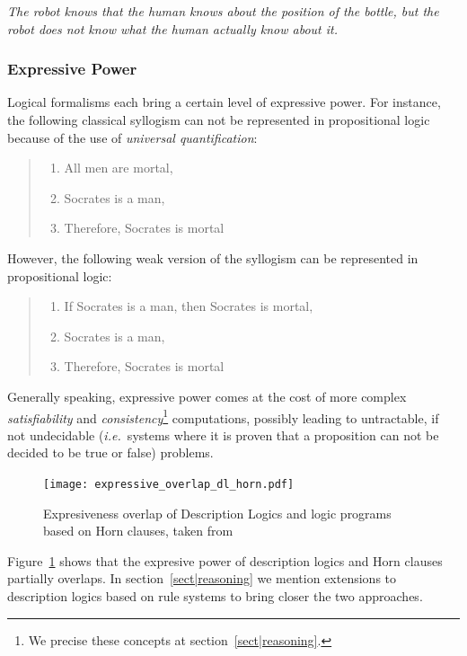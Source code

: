 \documentclass[a4paper, twocolumn]{article}
\newcommand{\ie}{{\textit{i.e.~}}}
\begin{document}
\emph{The robot knows that the human knows about the position of the bottle,
but the robot does not know what the human actually know about it.}

\subsubsection{Expressive Power}

Logical formalisms each bring a certain level of expressive power. For
instance, the following classical syllogism can not be represented in
propositional logic because of the use of \emph{universal quantification}:

\begin{quote}
\begin{enumerate}
    \item All men are mortal,
    \item Socrates is a man,
    \item Therefore, Socrates is mortal
\end{enumerate}
\end{quote}

However, the following weak version of the syllogism can be represented in
propositional logic:

\begin{quote}
\begin{enumerate}
    \item If Socrates is a man, then Socrates is mortal,
    \item Socrates is a man,
    \item Therefore, Socrates is mortal
\end{enumerate}
\end{quote}

Generally speaking, expressive power comes at the cost of more complex
\emph{satisfiability} and \emph{consistency}\footnote{We precise these concepts
at section~\ref{sect|reasoning}.} computations, possibly leading to
untractable, if not undecidable (\ie systems where it is proven that a
proposition can not be decided to be true or false) problems.

\begin{figure}
    \centering
    \texttt{[image: expressive\_overlap\_dl\_horn.pdf]}
    \caption{Expresiveness overlap of Description Logics and logic programs
    based on Horn clauses, taken from~\cite{Grosof2003}}
    \label{fig|overlap_dl_horn}
\end{figure}

Figure~\ref{fig|overlap_dl_horn} shows that the expresive power of description
logics and Horn clauses partially overlaps. In section~\ref{sect|reasoning} we
mention extensions to description logics based on rule systems to bring closer
the two approaches.
\end{document}
